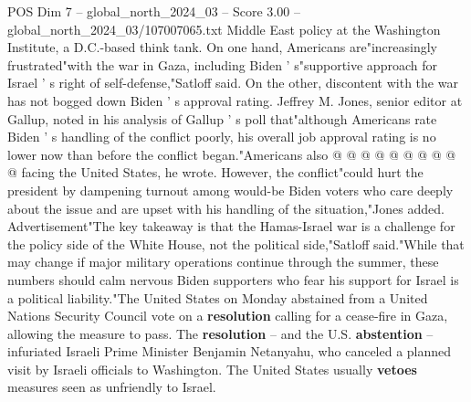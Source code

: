 \begin{textsample}{POS Dim 7 – global\_north\_2024\_03 – Score 3.00 – global\_north\_2024\_03/107007065.txt}
Middle East policy at the Washington Institute, a D.C.-based think tank.
On one hand, Americans are"increasingly frustrated"with the war in Gaza, including Biden ' s"supportive approach for Israel ' s right of self-defense,"Satloff said.
On the other, discontent with the war has not bogged down Biden ' s approval rating.
Jeffrey M.
Jones, senior editor at Gallup, noted in his analysis of Gallup ' s poll that"although Americans rate Biden ' s handling of the conflict poorly, his overall job approval rating is no lower now than before the conflict began."Americans also @ @ @ @ @ @ @ @ @ @ facing the United States, he wrote.
However, the conflict"could hurt the president by dampening turnout among would-be Biden voters who care deeply about the issue and are upset with his handling of the situation,"Jones added.
Advertisement"The key takeaway is that the Hamas-Israel war is a challenge for the policy side of the White House, not the political side,"Satloff said."While that may change if major military operations continue through the summer, these numbers should calm nervous Biden supporters who fear his support for Israel is a political liability."The United States on Monday abstained from a United Nations Security Council vote on a \textbf{resolution} calling for a cease-fire in Gaza, allowing the measure to pass.
The \textbf{resolution} -- and the U.S. \textbf{abstention} -- infuriated Israeli Prime Minister Benjamin Netanyahu, who canceled a planned visit by Israeli officials to Washington.
The United States usually \textbf{vetoes} measures seen as unfriendly to Israel.

\end{textsample}
